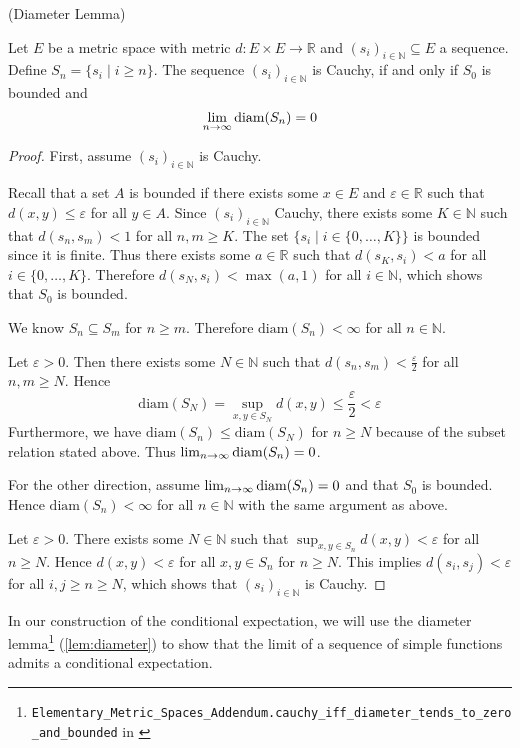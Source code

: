 \begin{lemma}\label{lem:diameter} (Diameter Lemma)\par
	Let $E$ be a metric space with metric $d : E \times E \rightarrow \mathbb{R}$ and $(s_i)_{i\in\mathbb{N}} \subseteq E$ a sequence. Define $S_n = \{s_i \; \vert \; i \ge n \}$. The sequence $(s_i)_{i\in\mathbb{N}}$ is Cauchy, if and only if $S_0$ is bounded and
	\[
		\lim_{n \to \infty} \textup{diam}(S_n) = 0
	\]
\end{lemma}
\begin{proof}
First, assume $(s_i)_{i\in\mathbb{N}}$ is Cauchy. 

Recall that a set $A$ is bounded if there exists some $x \in E$ and $\varepsilon \in \mathbb{R}$ such that $d(x,y) \le \varepsilon$ for all $y \in A$. Since $(s_i)_{i\in\mathbb{N}}$ Cauchy, there exists some $K \in \mathbb{N}$ such that $d(s_n,s_m) < 1$ for all $n, m \ge K$. The set $\{s_i \; \vert \; i \in \{0,\dots,K\}\}$ is bounded since it is finite. Thus there exists some $a \in \mathbb{R}$ such that $d(s_K, s_i) < a$ for all $i \in \{0,\dots,K\}$. Therefore $d(s_N, s_i) < \max(a, 1)$ for all $i \in \mathbb{N}$, which shows that $S_0$ is bounded. 

We know $S_n \subseteq S_m$ for $n \ge m$. Therefore $\textrm{diam}(S_n) < \infty$ for all $n \in \mathbb{N}$.

Let $\varepsilon > 0$. Then there exists some $N \in \mathbb{N}$ such that $d(s_n,s_m) < \frac{\varepsilon}{2}$ for all $n, m \ge N$. Hence
\[
	\textrm{diam}(S_N) = \sup_{x,y \in S_N} d(x,y) \le \frac{\varepsilon}{2} < \varepsilon
\]
Furthermore, we have $\textrm{diam}(S_n) \le \textrm{diam}(S_N)$ for $n \ge N$ because of the subset relation stated above. Thus $\lim_{n \to \infty} \textup{diam}(S_n) = 0$.\smallskip

For the other direction, assume $\lim_{n \to \infty} \textup{diam}(S_n) = 0$ and that $S_0$ is bounded. Hence $\textrm{diam}(S_n) < \infty$ for all $n \in \mathbb{N}$ with the same argument as above. 

Let $\varepsilon > 0$. There exists some $N \in \mathbb{N}$ such that $\sup_{x,y \in S_n} d(x,y) < \varepsilon$ for all $n \ge N$. Hence $d(x,y) < \varepsilon$ for all $x, y \in S_n$ for $n \ge N$. This implies $d(s_i,s_j) < \varepsilon$ for all $i, j \ge n \ge N$, which shows that $(s_i)_{i\in\mathbb{N}}$ is Cauchy.
\end{proof}

In our construction of the conditional expectation, we will use the diameter lemma\footnote{\texttt{Elementary\_Metric\_Spaces\_Addendum.cauchy\_iff\_diameter\_tends\_to\_zero\_and\_bounded} in \cite{Keskin_A_Formalization_of_2023}} (\ref{lem:diameter}) to show that the limit of a sequence of simple functions admits a conditional expectation. 

